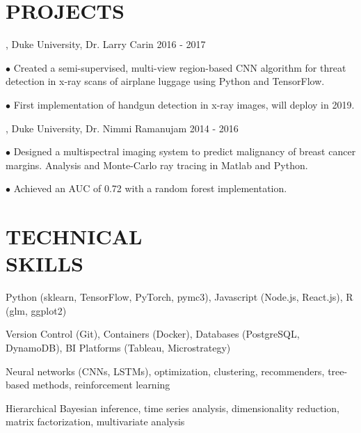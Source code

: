 \documentclass[resmargin, 11pt]{resume_style_class} %
\newenvironment{outline}
  {\begin{list}{}{\setlength{\leftmargin}{30pt}\setlength\itemsep{-2pt}}}
  {\end{list}}
\newenvironment{outline-cond}
  {\begin{list}{}{
  \setlength{\leftmargin}{30pt}
  \setlength\topsep{-10pt}
  \setlength\itemindent{-30pt}
  }}
  {\end{list}}
\begin{document}
\begin{resume}
\section{PROJECTS}

, Duke University, Dr. Larry Carin \hfill 2016 - 2017
\begin{outline}
\item[$\bullet$\hspace{0.1cm}] Created a semi-supervised, multi-view region-based CNN algorithm for threat detection in x-ray scans of airplane luggage using Python and TensorFlow.
\item[$\bullet$\hspace{0.1cm}] First implementation of handgun detection in x-ray images, will deploy in 2019.
\end{outline}

, Duke University, Dr. Nimmi Ramanujam \hfill 2014 - 2016
\begin{outline}
\item[$\bullet$\hspace{0.1cm}] Designed a multispectral imaging system to predict malignancy of breast cancer margins. Analysis and Monte-Carlo ray tracing in Matlab and Python.
\item[$\bullet$\hspace{0.1cm}]  Achieved an AUC of 0.72 with a random forest implementation.
\end{outline}


\section{TECHNICAL \\ SKILLS}
\begin{outline-cond} 
\item {} Python (sklearn, TensorFlow, PyTorch, pymc3), Javascript (Node.js, React.js), R (glm, ggplot2)
\item {} Version Control (Git), Containers (Docker), Databases (PostgreSQL, DynamoDB), BI Platforms (Tableau, Microstrategy)
\item {}
Neural networks (CNNs, LSTMs), optimization, clustering, recommenders, tree-based methods, reinforcement learning
\item {}
Hierarchical Bayesian inference, time series analysis, dimensionality reduction, matrix factorization, multivariate analysis
\end{outline-cond}


\end{resume}
\end{document}
